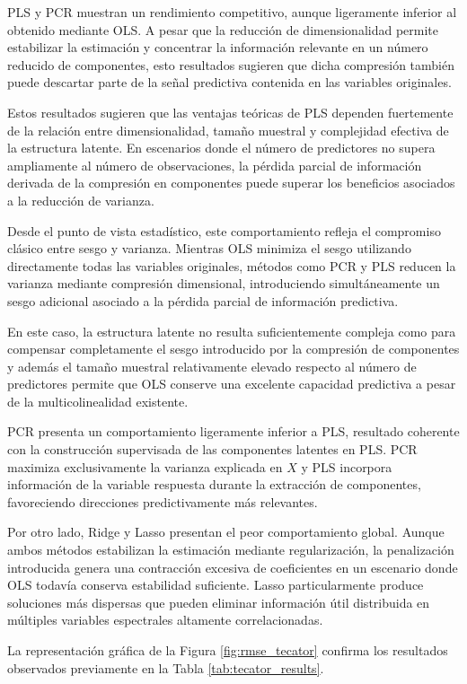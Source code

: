 \documentclass[12pt,a4paper]{report}
\begin{document}
PLS y PCR muestran un rendimiento competitivo, aunque ligeramente inferior al obtenido mediante OLS. A pesar que la reducción de dimensionalidad permite estabilizar la estimación y concentrar la información relevante en un número reducido de componentes, esto resultados sugieren que dicha compresión también puede descartar parte de la señal predictiva contenida en las variables originales. 

Estos resultados sugieren que las ventajas teóricas de PLS dependen fuertemente de la relación entre dimensionalidad, tamaño muestral y complejidad efectiva de la estructura latente. En escenarios donde el número de predictores no supera ampliamente al número de observaciones, la pérdida parcial de información derivada de la compresión en componentes puede superar los beneficios asociados a la reducción de varianza.

Desde el punto de vista estadístico, este comportamiento refleja el compromiso clásico entre sesgo y varianza. Mientras OLS minimiza el sesgo utilizando directamente todas las variables originales, métodos como PCR y PLS reducen la varianza mediante compresión dimensional, introduciendo simultáneamente un sesgo adicional asociado a la pérdida parcial de información predictiva.

En este caso, la estructura latente no resulta suficientemente compleja como para compensar completamente el sesgo introducido por la compresión de componentes y además el tamaño muestral relativamente elevado respecto al número de predictores permite que OLS conserve una excelente capacidad predictiva a pesar de la multicolinealidad existente.

PCR presenta un comportamiento ligeramente inferior a PLS, resultado coherente con la construcción supervisada de las componentes latentes en PLS. PCR maximiza exclusivamente la varianza explicada en $X$ y PLS incorpora información de la variable respuesta durante la extracción de componentes, favoreciendo direcciones predictivamente más relevantes.

Por otro lado, Ridge y Lasso presentan el peor comportamiento global. Aunque ambos métodos estabilizan la estimación mediante regularización, la penalización introducida genera una contracción excesiva de coeficientes en un escenario donde OLS todavía conserva estabilidad suficiente. Lasso particularmente produce soluciones más dispersas que pueden eliminar información útil distribuida en múltiples variables espectrales altamente correlacionadas.

La representación gráfica de la Figura \ref{fig:rmse_tecator} confirma los resultados observados previamente en la Tabla \ref{tab:tecator_results}.
\end{document}
